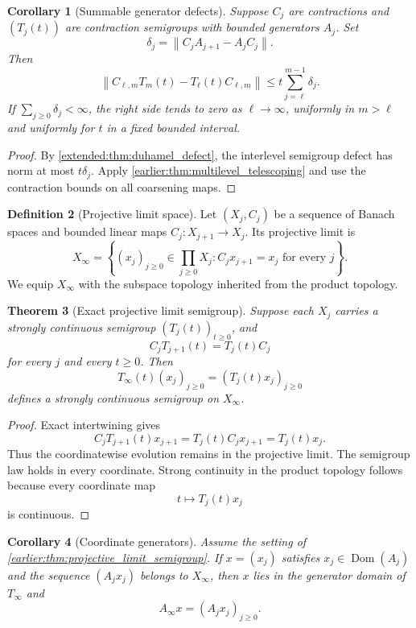 \documentclass[11pt,a4paper]{article}
\newtheorem{theorem}{Theorem}[section]
\newtheorem{corollary}[theorem]{Corollary}
\theoremstyle{definition}
\newtheorem{definition}[theorem]{Definition}
\theoremstyle{remark}
\newcommand{\norm}[1]{\left\lVert#1\right\rVert}
\begin{document}
\begin{corollary}[Summable generator defects]\label{earlier:record:005}\label{earlier:cor:summable_defects}
Suppose \(C_j\) are contractions and \((T_j(t))\) are contraction semigroups with bounded generators \(A_j\). Set
\[
\delta_j=\norm{C_jA_{j+1}-A_jC_j}.
\]
Then
\[
\norm{C_{\ell,m}T_m(t)-T_\ell(t)C_{\ell,m}}
\leq
 t\sum_{j=\ell}^{m-1}\delta_j.
\]
If \(\sum_{j\geq0}\delta_j<\infty\), the right side tends to zero as \(\ell\to\infty\), uniformly in \(m>\ell\) and uniformly for \(t\) in a fixed bounded interval.
\end{corollary}

\begin{proof}
By \cref{extended:thm:duhamel_defect}, the interlevel semigroup defect has norm at most \(t\delta_j\). Apply \cref{earlier:thm:multilevel_telescoping} and use the contraction bounds on all coarsening maps.
\end{proof}

\begin{definition}[Projective limit space]\label{earlier:record:006}\label{earlier:def:projective_limit}
Let \((X_j,C_j)\) be a sequence of Banach spaces and bounded linear maps \(C_j:X_{j+1}\to X_j\). Its projective limit is
\[
X_\infty
=
\left\{
(x_j)_{j\geq0}\in\prod_{j\geq0}X_j:
C_jx_{j+1}=x_j\text{ for every }j
\right\}.
\]
We equip \(X_\infty\) with the subspace topology inherited from the product topology.
\end{definition}

\begin{theorem}[Exact projective limit semigroup]\label{earlier:record:007}\label{earlier:thm:projective_limit_semigroup}
Suppose each \(X_j\) carries a strongly continuous semigroup \((T_j(t))_{t\geq0}\), and
\[
C_jT_{j+1}(t)=T_j(t)C_j
\]
for every \(j\) and every \(t\geq0\). Then
\[
T_\infty(t)(x_j)_{j\geq0}
=
(T_j(t)x_j)_{j\geq0}
\]
defines a strongly continuous semigroup on \(X_\infty\).
\end{theorem}

\begin{proof}
Exact intertwining gives
\[
C_jT_{j+1}(t)x_{j+1}
=
T_j(t)C_jx_{j+1}
=
T_j(t)x_j.
\]
Thus the coordinatewise evolution remains in the projective limit. The semigroup law holds in every coordinate. Strong continuity in the product topology follows because every coordinate map
\[
t\longmapsto T_j(t)x_j
\]
is continuous.
\end{proof}

\begin{corollary}[Coordinate generators]\label{earlier:record:008}\label{earlier:cor:projective_generators}
Assume the setting of \cref{earlier:thm:projective_limit_semigroup}. If \(x=(x_j)\) satisfies \(x_j\in\operatorname{Dom}(A_j)\) and the sequence \((A_jx_j)\) belongs to \(X_\infty\), then \(x\) lies in the generator domain of \(T_\infty\) and
\[
A_\infty x=(A_jx_j)_{j\geq0}.
\]
\end{corollary}
\end{document}
